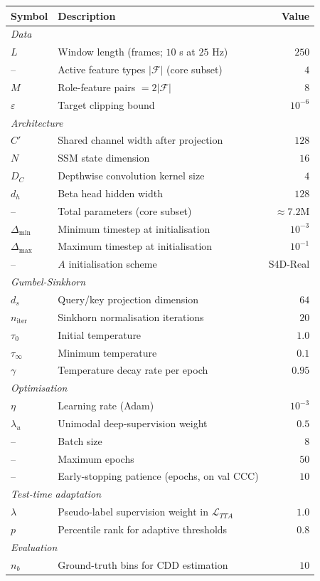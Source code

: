\documentclass[11pt,a4paper]{article}
\begin{document}
	\begin{center}
	\begin{tabular}{llr}
		\toprule
		\textbf{Symbol} & \textbf{Description} & \textbf{Value} \\
		\midrule
		\multicolumn{3}{l}{\textit{Data}} \\
		$L$ & Window length (frames; $10$ s at $25$ Hz) & $250$ \\
		-- & Active feature types $|\mathcal{F}|$ (core subset) & $4$ \\
		$M$ & Role-feature pairs $= 2|\mathcal{F}|$ & $8$ \\
		$\varepsilon$ & Target clipping bound & $10^{-6}$ \\
		\midrule
		\multicolumn{3}{l}{\textit{Architecture}} \\
		$C'$ & Shared channel width after projection & $128$ \\
		$N$ & SSM state dimension & $16$ \\
		$D_C$ & Depthwise convolution kernel size & $4$ \\
		$d_h$ & Beta head hidden width & $128$ \\
		-- & Total parameters (core subset) & $\approx 7.2$M \\
		$\Delta_{\min}$ & Minimum timestep at initialisation & $10^{-3}$ \\
		$\Delta_{\max}$ & Maximum timestep at initialisation & $10^{-1}$ \\
		-- & $A$ initialisation scheme & S4D-Real \\
		\midrule
		\multicolumn{3}{l}{\textit{Gumbel-Sinkhorn}} \\
		$d_s$ & Query/key projection dimension & $64$ \\
		$n_{\text{iter}}$ & Sinkhorn normalisation iterations & $20$ \\
		$\tau_0$ & Initial temperature & $1.0$ \\
		$\tau_\infty$ & Minimum temperature & $0.1$ \\
		$\gamma$ & Temperature decay rate per epoch & $0.95$ \\
		\midrule
		\multicolumn{3}{l}{\textit{Optimisation}} \\
		$\eta$ & Learning rate (Adam) & $10^{-3}$ \\
		$\lambda_u$ & Unimodal deep-supervision weight & $0.5$ \\
		-- & Batch size & $8$ \\
		-- & Maximum epochs & $50$ \\
		-- & Early-stopping patience (epochs, on val CCC) & $10$ \\
		\midrule
		\multicolumn{3}{l}{\textit{Test-time adaptation}} \\
		$\lambda$ & Pseudo-label supervision weight in $\mathcal{L}_{TTA}$ & $1.0$ \\
		$p$ & Percentile rank for adaptive thresholds & $0.8$ \\
		\midrule
		\multicolumn{3}{l}{\textit{Evaluation}} \\
		$n_b$ & Ground-truth bins for CDD estimation & $10$ \\
		\bottomrule
	\end{tabular}
	\end{center}
	
\end{document}
